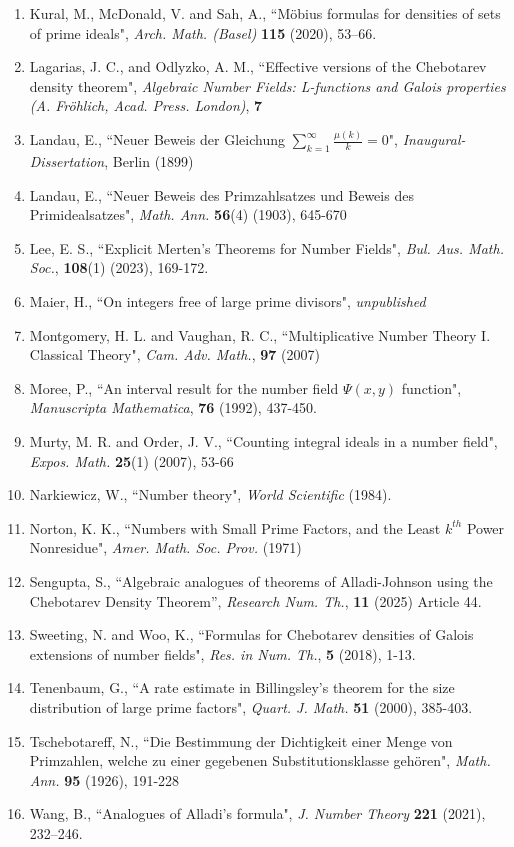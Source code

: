 \documentclass[12pt]{article}
\numberwithin{equation}{section}
\numberwithin{equation}{section}
\begin{document}
\begin{enumerate}
\item[{[KMS20]}] Kural, M., McDonald, V. and Sah, A.,
``Möbius formulas for densities of sets of prime ideals", 
\textit{Arch. Math. (Basel)} \textbf{115} (2020), 53–66.
\item[{[LO77]}]  Lagarias, J. C., and Odlyzko, A. M., ``Effective versions of the Chebotarev density theorem", \textit{Algebraic Number Fields: L-functions and Galois properties (A. Fr\"ohlich, Acad. Press. London)}, \textbf{7} 
\item[{[LaT99]}] Landau, E., ``Neuer Beweis der Gleichung $\sum_{k=1}^{\infty}\frac{\mu(k)}{k}=0$", \textit{Inaugural-Dissertation}, Berlin (1899)
\item[{[La03]}] Landau, E., ``Neuer Beweis des Primzahlsatzes und Beweis des Primidealsatzes", \textit{Math. Ann.} \textbf{56}(4) (1903), 645-670
\item[{[Le23]}] Lee, E. S., ``Explicit Merten's Theorems for Number Fields", \textit{Bul. Aus. Math. Soc.}, \textbf{108}(1) (2023), 169-172.
\item[{[Ma(up)]}] Maier, H., ``On integers free of large prime divisors", \textit{unpublished} 
\item[{[MV07]}] Montgomery, H. L. and Vaughan, R. C., ``Multiplicative Number Theory I. Classical Theory", \textit{Cam. Adv. Math.}, \textbf{97} (2007) 
\item[{[Mo92]}] Moree, P., ``An interval result for the number field $\Psi(x,y)$ function", \textit{Manuscripta Mathematica}, \textbf{76} (1992), 437-450. 
\item[{[MO07]}] Murty, M. R. and Order, J. V., ``Counting integral ideals in a number field", \textit{Expos. Math.} \textbf{25}(1) (2007), 53-66 
\item[{[Na84]}] Narkiewicz, W., ``Number theory", \textit{World Scientific} (1984).
\item[{[No71]}] Norton, K. K., ``Numbers with Small Prime Factors, and the Least $k^{th}$ Power Nonresidue", \textit{Amer. Math. Soc. Prov.} (1971) 
\item[{[Se25]}] Sengupta, S., ``Algebraic analogues of theorems of Alladi-Johnson using the Chebotarev Density Theorem'', {\it{Research Num. Th.}}, {\bf{11}} (2025) Article 44. 
\item[{[SW18]}]  Sweeting, N. and Woo, K., ``Formulas for Chebotarev densities of Galois extensions of number fields", \textit{Res. in Num. Th.}, \textbf{5} (2018), 1-13. 
\item[{[Te00]}] Tenenbaum, G., ``A rate estimate in Billingsley's theorem for the size distribution of large prime factors", \textit{Quart. J. Math.} \textbf{51} (2000), 385-403. 
 \item[{[Ts26]}] Tschebotareff, N., ``Die Bestimmung der Dichtigkeit einer Menge von Primzahlen, welche zu einer gegebenen Substitutionsklasse geh\"oren", \textit{Math. Ann.} \textbf{95} (1926), 191-228 
\item[{[Wa21]}] Wang, B., ``Analogues of Alladi's formula", \textit{J. Number Theory} \textbf{221} (2021), 232–246. 
\end{enumerate}
\end{document}
